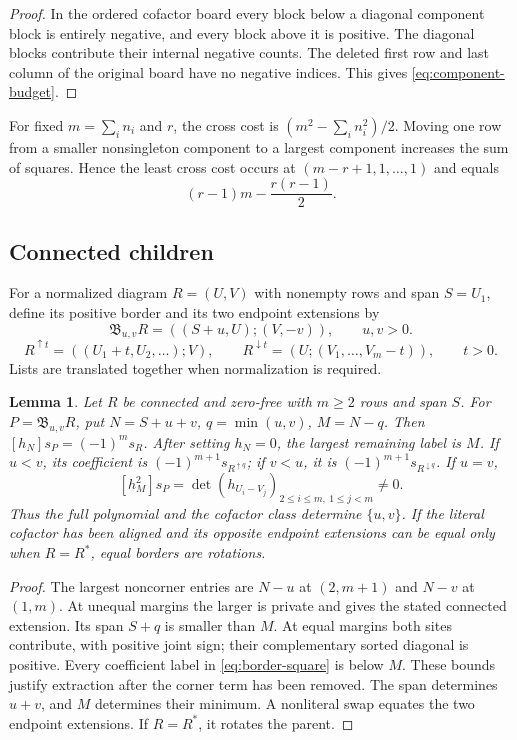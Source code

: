 \documentclass[11pt,a4paper]{amsart}
\numberwithin{equation}{section}
\theoremstyle{plain}
\newtheorem{lemma}[theorem]{Lemma}
\theoremstyle{definition}
\newcommand{\B}{\mathfrak B}
\begin{document}
\begin{proof}
In the ordered cofactor board every block below a diagonal component block is entirely negative, and every block above it is positive.  The diagonal blocks contribute their internal negative counts.  The deleted first row and last column of the original board have no negative indices.  This gives \eqref{eq:component-budget}.
\end{proof}

For fixed \(m=\sum_i n_i\) and \(r\), the cross cost is \((m^2-\sum_i n_i^2)/2\).  Moving one row from a smaller nonsingleton component to a largest component increases the sum of squares.  Hence the least cross cost occurs at \((m-r+1,1,\ldots,1)\) and equals
\[
 (r-1)m-\frac{r(r-1)}2.
\]

\subsection{Connected children}

For a normalized diagram \(R=(U,V)\) with nonempty rows and span \(S=U_1\), define
its positive border and its two endpoint extensions by
\begin{equation}\label{eq:border-definition}
 \B_{u,v}R=((S+u,U);(V,-v)),\qquad u,v>0.
\end{equation}
\[
 R^{\uparrow t}=((U_1+t,U_2,\ldots);V),\qquad
 R^{\downarrow t}=(U;(V_1,\ldots,V_m-t)),\qquad t>0.
\]
Lists are translated together when normalization is required.

\begin{lemma}\label{lem:border}
Let \(R\) be connected and zero-free with \(m\ge2\) rows and span \(S\).
For \(P=\B_{u,v}R\), put \(N=S+u+v\), \(q=\min(u,v)\), \(M=N-q\).
Then \([h_N]s_P=(-1)^m s_R\).  After setting \(h_N=0\), the largest
remaining label is \(M\).  If \(u<v\), its coefficient is
\((-1)^{m+1}s_{R^{\uparrow q}}\); if \(v<u\), it is
\((-1)^{m+1}s_{R^{\downarrow q}}\).  If \(u=v\),
\begin{equation}\label{eq:border-square}
 [h_M^2]s_P=\det(h_{U_i-V_j})_{2\le i\le m,\ 1\le j<m}\ne0.
\end{equation}
Thus the full polynomial and the cofactor class determine \(\{u,v\}\).
If the literal cofactor has been aligned and its opposite endpoint
extensions can be equal only when \(R=R^*\), equal borders are rotations.
\end{lemma}

\begin{proof}
The largest noncorner entries are \(N-u\) at \((2,m+1)\) and \(N-v\)
at \((1,m)\).  At unequal margins the larger is private and gives the
stated connected extension.  Its span \(S+q\) is smaller than \(M\).
At equal margins both sites contribute, with positive joint sign; their
complementary sorted diagonal is positive.  Every coefficient label in
\eqref{eq:border-square} is below \(M\).  These bounds justify extraction
after the corner term has been removed.  The span determines \(u+v\), and
\(M\) determines their minimum.  A nonliteral swap equates the two
endpoint extensions.  If \(R=R^*\), it rotates the parent.
\end{proof}
\end{document}
